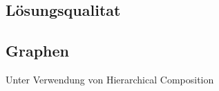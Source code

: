 %            
%            
%            
%            
%
%            
%            
%            
%            
%
%            
%            
%            
%
%            
%            
%            
%            

\subsection{Lösungsqualitat}
\subsection{Graphen}
Unter Verwendung von Hierarchical Composition

